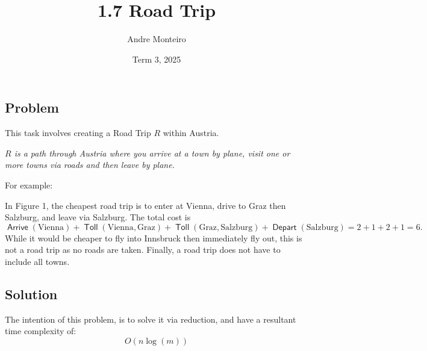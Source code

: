 \documentclass[12pt]{article}
\title{1.7 Road Trip}
\author{Andre Monteiro}
\date{Term 3, 2025}
\newcommand{\R}[1]{{\color{myred}#1}}
\newcommand{\B}[1]{{\color{myblue}#1}}
\DeclareMathOperator{\arr}{\mathsf{Arrive}}
\DeclareMathOperator{\dep}{\mathsf{Depart}}
\DeclareMathOperator{\toll}{\mathsf{Toll}}
\begin{document}
\maketitle
\newpage
\subsection*{Problem}
This task involves creating a Road Trip $R$ within Austria.

\emph{$R$ is a path through Austria where you arrive at a town by plane, visit one or more towns via roads and then leave by plane. 
}

For example: 

\begin{figure}[H]
    \centering
    \caption{}
    \label{example-1}
\end{figure}

In Figure 1, the cheapest road trip is to enter at Vienna, drive to Graz then Salzburg, and leave via Salzburg. The total cost is $$\arr(\text{Vienna}) + \toll(\text{Vienna}, \text{Graz}) + \toll(\text{Graz}, \text{Salzburg}) + \dep(\text{Salzburg}) = 2 + 1 + 2 + 1 = 6.$$ While it would be cheaper to fly into Innsbruck then immediately fly out, this is not a road trip as no roads are taken. Finally, a road trip does not have to include all towns.

\newpage

\subsection*{Solution}
The intention of this problem, is to solve it via reduction, and have a resultant time complexity of: 
\[
O(n \log(m))
\]
\end{document}
